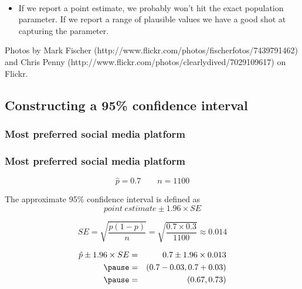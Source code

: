\documentclass[notes,11pt, aspectratio=169]{beamer}
\begin{document}
\begin{frame}[shrink]
\begin{itemize}
\begin{columns}[c]
\end{columns}
$\:$ \\
\item If we report a point estimate, we probably won't hit the exact population parameter. If we report a range of plausible values we have a good shot at capturing the parameter. 

\end{itemize}

{\tiny Photos by Mark Fischer (http://www.flickr.com/photos/fischerfotos/7439791462) and Chris Penny (http://www.flickr.com/photos/clearlydived/7029109617) on Flickr.}


\end{frame}


\subsection{Constructing a 95\% confidence interval}


\begin{frame}
\frametitle{Most preferred social media platform}



\end{frame}


\begin{frame}
\frametitle{Most preferred social media platform}

\[ \hat{p} = 0.7 \qquad n = 1100 \]

\pause

The approximate 95\% confidence interval is defined as 
\[ point~estimate \pm 1.96 \times SE \]

\pause

\vspace{-0.25cm}
\[ SE = \sqrt{\frac{p(1-p)}{n}} = \sqrt{\frac{0.7 \times 0.3}{1100}} \approx 0.014 \]

\pause

\vspace{-0.25cm}
\begin{eqnarray*}
\hat{p} \pm 1.96 \times SE &=& 0.7 \pm 1.96 \times 0.013 \\
\pause
&=& (0.7 - 0.03, 0.7 + 0.03) \\
\pause
&=& (0.67, 0.73)
\end{eqnarray*}


\end{frame}
\end{document}
